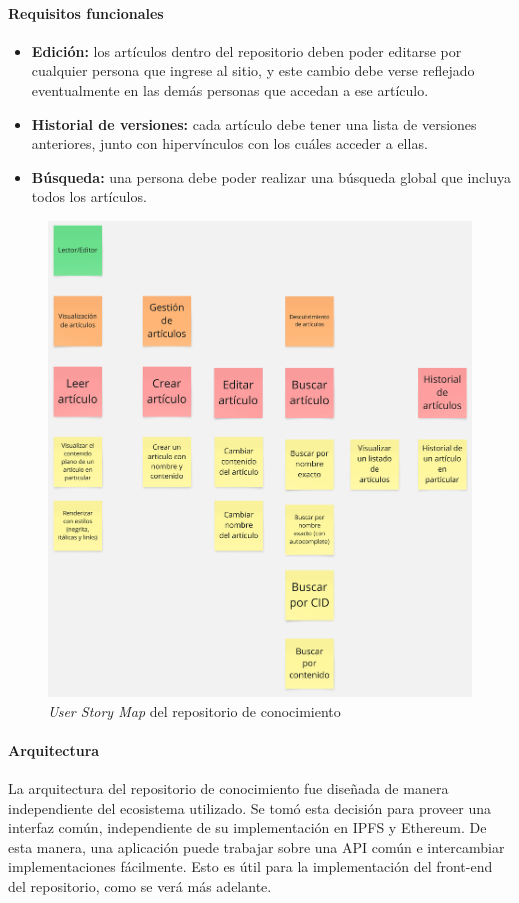 \paragraph{Requisitos funcionales}

\begin{itemize}
    \item \textbf{Edición:} los artículos dentro del repositorio deben poder editarse por cualquier persona que ingrese al sitio, y este cambio debe verse reflejado eventualmente en las demás personas que accedan a ese artículo.
    \item \textbf{Historial de versiones:} cada artículo debe tener una lista de versiones anteriores, junto con hipervínculos con los cuáles acceder a ellas.
    \item \textbf{Búsqueda:} una persona debe poder realizar una búsqueda global que incluya todos los artículos.
\end{itemize}

\begin{figure}[H]
    \centering
    \includegraphics[width=0.5\linewidth]{img/solucion-wiki/usm-wiki.jpg}
    \caption{\textit{User Story Map} del repositorio de conocimiento}
    \label{fig:usm-wiki}
\end{figure}

\paragraph{Arquitectura}

La arquitectura del repositorio de conocimiento fue diseñada de manera independiente del ecosistema utilizado. Se tomó esta decisión para proveer una interfaz común, independiente de su implementación en IPFS y Ethereum. De esta manera, una aplicación puede trabajar sobre una API común e intercambiar implementaciones fácilmente. Esto es útil para la implementación del front-end del repositorio, como se verá más adelante.

